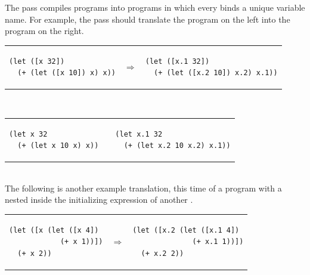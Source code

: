 \documentclass[11pt]{book}
\newcommand{\ocaml}[1]{{\color{blue}{#1}}}
\begin{document}
The  pass compiles \LangVar{} programs into \LangVar{}
programs in which every  binds a unique variable name. For
example, the  pass should translate the program on the
left into the program on the right. \\
\begin{tabular}{lll}
\begin{minipage}{0.4\textwidth}
\begin{lstlisting}
(let ([x 32])
  (+ (let ([x 10]) x) x))
\end{lstlisting}
\end{minipage}
&
$\Rightarrow$
&
\begin{minipage}{0.4\textwidth}
\begin{lstlisting}
(let ([x.1 32])
  (+ (let ([x.2 10]) x.2) x.1))
\end{lstlisting}
\end{minipage}
\end{tabular} \\
%
\begin{tabular}{lll}
\begin{minipage}{0.4\textwidth}
\begin{lstlisting}[style=ocaml]
(let x 32
  (+ (let x 10 x) x))
\end{lstlisting}
\end{minipage}
&
\ocaml{$\Rightarrow$}
&
\begin{minipage}{0.4\textwidth}
\begin{lstlisting}[style=ocaml]
(let x.1 32
  (+ (let x.2 10 x.2) x.1))
\end{lstlisting}
\end{minipage}
\end{tabular} \\
%
The following is another example translation, this time of a program
with a  nested inside the initializing expression of another
.\\
\begin{tabular}{lll}
\begin{minipage}{0.4\textwidth}
\begin{lstlisting}
(let ([x (let ([x 4])
            (+ x 1))])
  (+ x 2))
\end{lstlisting}
\end{minipage}
&
$\Rightarrow$
&
\begin{minipage}{0.4\textwidth}
\begin{lstlisting}
(let ([x.2 (let ([x.1 4])
              (+ x.1 1))])
  (+ x.2 2))
\end{lstlisting}
\end{minipage}
\end{tabular}
\end{document}

